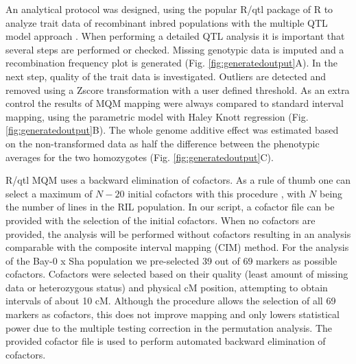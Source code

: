 An analytical protocol was designed, using the popular R/qtl package of R to analyze trait data of 
recombinant inbred populations with the multiple QTL model approach \cite{Arends:2010}. When 
performing a detailed QTL analysis it is important that several steps are performed or checked. 
Missing genotypic data is imputed and a recombination frequency plot is generated (Fig. \ref{fig:generatedoutput}A). In 
the next step, quality of the trait data is investigated. Outliers are detected and removed using 
a Zscore transformation with a user defined threshold. As an extra control the results of MQM mapping 
were always compared to standard interval mapping, using the parametric model with Haley Knott 
regression \cite{Haley:1992} (Fig. \ref{fig:generatedoutput}B). The whole genome additive effect was estimated based 
on the non-transformed data as half the difference between the phenotypic averages for the two 
homozygotes (Fig. \ref{fig:generatedoutput}C).

R/qtl MQM uses a backward elimination of cofactors. As a rule of thumb one can select a maximum of 
$N-20$ initial cofactors with this procedure \cite{Handbook:Jansen:2007}, with $N$ being the number of lines in 
the RIL population. In our script, a cofactor file can be provided with the selection of the initial 
cofactors. When no cofactors are provided, the analysis will be performed without cofactors resulting 
in an analysis comparable with the composite interval mapping (CIM) method. For the analysis of the 
Bay-0 x Sha population we pre-selected 39 out of 69 markers as possible cofactors. Cofactors were selected 
based on their quality (least amount of missing data or heterozygous status) and physical cM position, 
attempting to obtain intervals of about 10 cM. Although the procedure allows the selection of all 69 
markers as cofactors, this does not improve mapping and only lowers statistical power due to the 
multiple testing correction in the permutation analysis. The provided cofactor file is used to perform 
automated backward elimination of cofactors.

